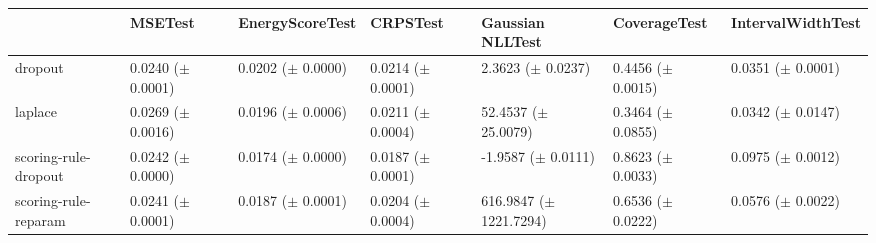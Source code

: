 \begin{tabular}{lllllll}
\toprule
 & MSETest & EnergyScoreTest & CRPSTest & Gaussian NLLTest & CoverageTest & IntervalWidthTest \\
\midrule
dropout & \makecell{0.0240 \\ ($\pm$ 0.0001)} & \makecell{0.0202 \\ ($\pm$ 0.0000)} & \makecell{0.0214 \\ ($\pm$ 0.0001)} & \makecell{2.3623 \\ ($\pm$ 0.0237)} & \makecell{0.4456 \\ ($\pm$ 0.0015)} & \makecell{0.0351 \\ ($\pm$ 0.0001)} \\
laplace & \makecell{0.0269 \\ ($\pm$ 0.0016)} & \makecell{0.0196 \\ ($\pm$ 0.0006)} & \makecell{0.0211 \\ ($\pm$ 0.0004)} & \makecell{52.4537 \\ ($\pm$ 25.0079)} & \makecell{0.3464 \\ ($\pm$ 0.0855)} & \makecell{0.0342 \\ ($\pm$ 0.0147)} \\
scoring-rule-dropout & \makecell{0.0242 \\ ($\pm$ 0.0000)} & \makecell{0.0174 \\ ($\pm$ 0.0000)} & \makecell{0.0187 \\ ($\pm$ 0.0001)} & \makecell{-1.9587 \\ ($\pm$ 0.0111)} & \makecell{0.8623 \\ ($\pm$ 0.0033)} & \makecell{0.0975 \\ ($\pm$ 0.0012)} \\
scoring-rule-reparam & \makecell{0.0241 \\ ($\pm$ 0.0001)} & \makecell{0.0187 \\ ($\pm$ 0.0001)} & \makecell{0.0204 \\ ($\pm$ 0.0004)} & \makecell{616.9847 \\ ($\pm$ 1221.7294)} & \makecell{0.6536 \\ ($\pm$ 0.0222)} & \makecell{0.0576 \\ ($\pm$ 0.0022)} \\
\bottomrule
\end{tabular}
